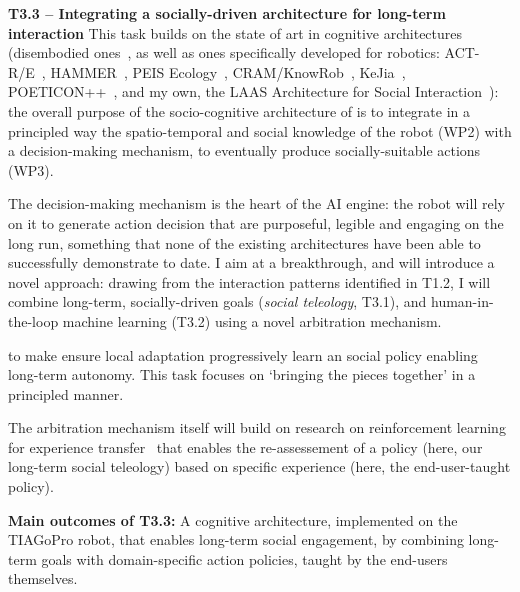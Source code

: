 \begin{rewrite}
\textbf{T3.3 -- Integrating a socially-driven architecture for long-term interaction}
This task builds on the state of art in cognitive architectures (disembodied
ones~\cite{chong2007integrated,vernon2007survey,kingdon2008review,duch2008cognitive,langley2009cognitive,taatgen2010past,thorisson2012cognitive},
as well as ones specifically developed for robotics:
ACT-R/E~\cite{trafton2013act}, HAMMER~\cite{demiris2006hierarchical}, PEIS
Ecology~\cite{saffiotti2005peis,daoutis2012cooperative},
CRAM/KnowRob~\cite{beetz2010cram, tenorth2009knowrob},
KeJia~\cite{chen2010developing}, POETICON++~\cite{antunes2016human}, and my own,
the LAAS Architecture for Social Interaction~\cite{lemaignan2017artificial}):
the overall purpose of the socio-cognitive architecture of \project is to
integrate in a principled way the spatio-temporal and social knowledge of the
robot (WP2) with a decision-making mechanism, to eventually produce
socially-suitable actions (WP3). 

The decision-making mechanism is the heart of the \project AI engine: the robot
will rely on it to generate action decision that are purposeful, legible and engaging on the
long run, something that none of the existing architectures have been able to
successfully demonstrate to date. I aim at a breakthrough, and will
introduce a novel approach: drawing from the interaction patterns identified
in T1.2, I will combine long-term, socially-driven goals (\emph{social teleology}, T3.1), and
human-in-the-loop machine learning (T3.2) using a novel arbitration mechanism.

to make ensure local adaptation  progressively learn an social
policy enabling long-term autonomy. This task focuses on `bringing the pieces
together' in a principled manner.


The arbitration mechanism itself will build on research on reinforcement
learning for experience transfer~\cite{madden2004transfer} that enables the
re-assessement of a policy (here, our long-term social teleology) based on
specific experience (here, the end-user-taught policy).


\begin{framed}
    {\noindent\bf Main outcomes of T3.3:} A cognitive architecture, implemented
    on the TIAGoPro robot, that enables long-term social engagement, by combining
    long-term goals with domain-specific action policies, taught by the
    end-users themselves.
\end{framed}

\end{rewrite}


